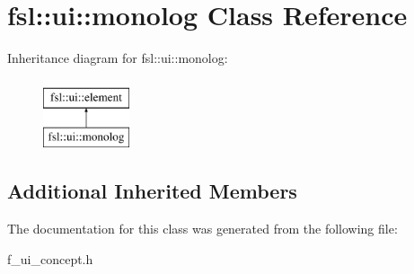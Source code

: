 \hypertarget{classfsl_1_1ui_1_1monolog}{}\section{fsl\+::ui\+::monolog Class Reference}
\label{classfsl_1_1ui_1_1monolog}
Inheritance diagram for fsl\+::ui\+::monolog\+:\begin{figure}[H]
\begin{center}
\leavevmode
\includegraphics[height=2.000000cm]{classfsl_1_1ui_1_1monolog}
\end{center}
\end{figure}
\subsection*{Additional Inherited Members}


The documentation for this class was generated from the following file\+:\begin{DoxyCompactItemize}
\item 
f\+\_\+ui\+\_\+concept.\+h\end{DoxyCompactItemize}
